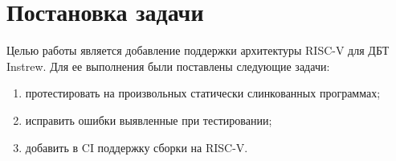 
\section{Постановка задачи}
\label{sec:task}

Целью работы является добавление поддержки архитектуры \mbox{RISC-V} для ДБТ Instrew. Для ее выполнения были поставлены следующие задачи:
\begin{enumerate}
    \item протестировать на произвольных статически слинкованных программах;
    \item исправить ошибки выявленные при тестировании;
    \item добавить в CI поддержку сборки на RISC-V.
\end{enumerate}

